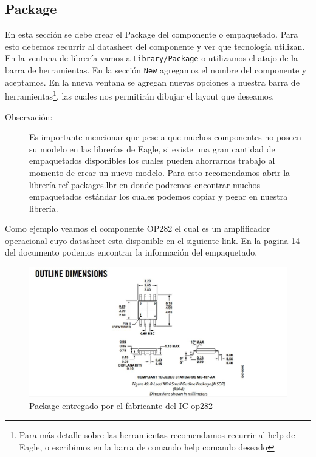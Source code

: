 \documentclass[11pt,letterpaper,spanish]{article}
\begin{document}
\subsection{Package\label{package}}
En esta sección se debe crear el Package del componente o empaquetado. Para esto debemos recurrir al datasheet del componente y ver que tecnología utilizan. En la ventana de librería vamos a \verb+Library/Package+ o utilizamos el atajo de la barra de herramientas. En la sección \verb+New+ agregamos el nombre del componente y aceptamos. 
En la nueva ventana se agregan nuevas opciones a nuestra barra de herramientas\footnote{Para más detalle sobre las herramientas recomendamos recurrir al help de Eagle, o escribimos en la barra de comando help comando deseado}, las cuales nos permitirán dibujar el layout que deseamos. 
\begin{description}
\item[Observación:] Es importante mencionar que pese a que muchos componentes no poseen su modelo en las librerías de Eagle, si existe una gran cantidad de empaquetados disponibles los cuales pueden ahorrarnos trabajo al momento de crear un nuevo modelo. Para esto recomendamos abrir la librería ref-packages.lbr en donde podremos encontrar muchos empaquetados estándar los cuales podemos copiar y pegar en nuestra librería.
\end{description}
Como ejemplo veamos el componente OP282 el cual es un amplificador operacional cuyo datasheet esta disponible en el siguiente \href{http://www.analog.com/media/en/technical-documentation/data-sheets/OP282_482.pdf}{link}. En la pagina 14 del documento podemos encontrar la información del empaquetado.

\begin{figure}[!h]
\begin{center}
\includegraphics[scale=0.4]{figuras/3.JPG}
\end{center}
\caption{Package entregado por el fabricante del IC op282}
\end{figure}
\end{document}

